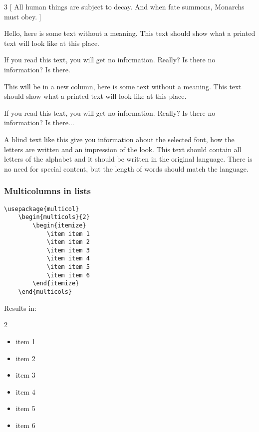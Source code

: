 \begin{multicols}{3}
[
All human things are subject to decay. And when fate summons, Monarchs must obey.
]
 
Hello, here is some text without a meaning.  This text should show what 
a printed text will look like at this place.



If you read this text, you will get no information.  Really?  Is there 
no information?  Is there.
 
\columnbreak
 
This will be in a new column, here is some text without a meaning.  This text 
should show what a printed text will look like at this place.
 
If you read this text, you will get no information.  Really?  Is there 
no information?  Is there...

A blind text like this give you information about the selected font, how the letters are written and an impression of the look. This text should contain all letters of the alphabet and it should be written in the original language. There is no need for special content, but the length of words should match the language.
\end{multicols}

\setlength{\columnseprule}{0pt}
\def\columnseprulecolor{\color{black}}


\subsubsection{Multicolumns in lists}
\begin{lstlisting}[language=Tex]
    \usepackage{multicol}
    \begin{multicols}{2}
        \begin{itemize}
            \item item 1
            \item item 2
            \item item 3
            \item item 4
            \item item 5
            \item item 6
        \end{itemize}
    \end{multicols}
\end{lstlisting}

Results in:
\begin{multicols}{2}
    \begin{itemize}
        \item item 1
        \item item 2
        \item item 3
        \item item 4
        \item item 5
        \item item 6
    \end{itemize}
\end{multicols}






